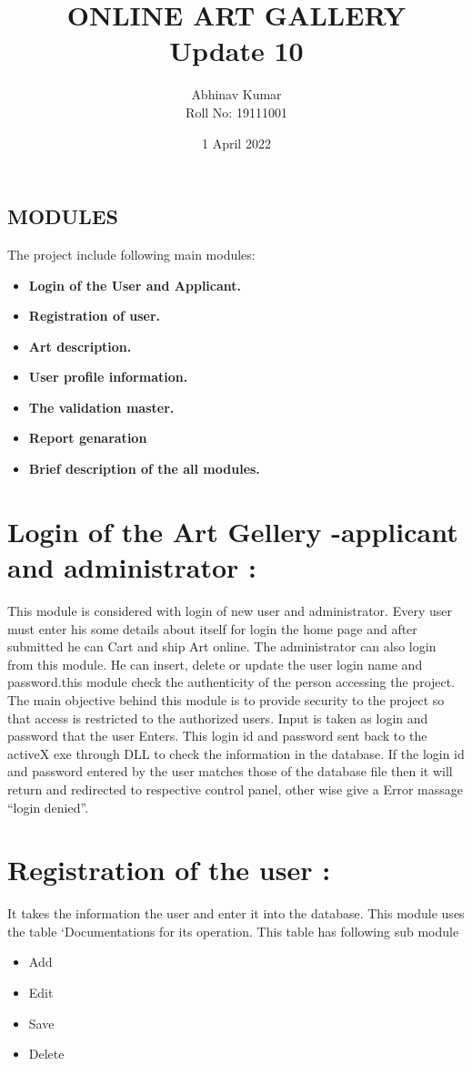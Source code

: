 \documentclass{article}
\title{ONLINE ART GALLERY \\ Update 10}
\date{1 April 2022}
\author{Abhinav Kumar \\ Roll No: 19111001 }
\begin{document}
\maketitle
\begin{center}
    \section*{\textbf{MODULES}} 
\end{center}
The project include following main modules:
\\
\begin{itemize}
    \item \textbf{Login of the User and Applicant.}
\item \textbf{ Registration of user.}
\item \textbf{Art description.}
\item \textbf{ User profile information.}
\item \textbf{The validation master.}
\item \textbf{Report genaration}
\item \textbf{Brief description of the all modules.}
\end{itemize}
\section*{Login of the Art Gellery -applicant and administrator : }
This module is considered with login of new user and administrator. Every user must enter his some details about itself for login the home page and after submitted he can Cart and ship Art online. The administrator can also login from this module. He can insert, delete or update the user login name and password.this module check the authenticity of the person accessing the project. The main objective behind this module is to provide security to the project so that access is restricted to the authorized users.
            Input is taken as login and password that the user Enters.
            This login id and password sent back to the activeX exe through DLL to check the information in the database.
            If the login id and password entered by the user matches those of the database file then it will return and redirected to respective control panel, other wise give a Error massage “login denied”.
\section*{Registration of the user : }
It takes the information the user and enter it into the database. This module uses the table ‘Documentations for its operation.
This table has following sub module
\begin{itemize}
    \item Add
\item Edit
\item Save
\item Delete
\end{itemize}
\\
\end{document}
